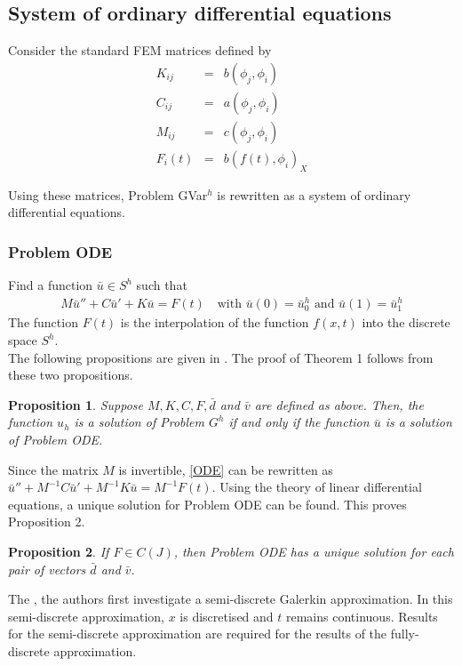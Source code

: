 \documentclass[../../main.tex]{subfiles}
\begin{document}
\subsection{System of ordinary differential equations}
Consider the standard FEM matrices defined by
\begin{eqnarray*}
	K_{ij} & = & b(\phi_j, \phi_i)\\
	C_{ij} & = & a(\phi_j, \phi_i)\\
	M_{ij} & = & c(\phi_j, \phi_i)\\
	F_{i}(t) & = & b(f(t), \phi_i)_X
\end{eqnarray*}

Using these matrices, Problem GVar$^h$ is rewritten as a system of ordinary differential equations.
\subsubsection*{Problem ODE}
Find a function $\bar{u} \in S^h$ such that
\begin{eqnarray}
	M\bar{u}'' + C \bar{u}' + K\bar{u} = F(t) \ \ \ \textrm{ with } \bar{u}(0) = \bar{u}^h_0 \textrm{ and }  \bar{u}(1) = \bar{u}^h_1 \label{ODE}
\end{eqnarray}
The function $F(t)$ is the interpolation of the function $f(x,t)$ into the discrete space $S^h$. \\

The following propositions are given in \cite{BV13}. The proof of Theorem 1 follows from these two propositions.

\newtheorem{DC_Prop2}{Proposition}
\begin{DC_Prop2}
	Suppose $M, K, C, F,\bar{d}$  and $\bar{v}$ are defined as above. Then, the function $u_{h}$ is a solution of Problem $G^{h}$ if and only if the function $\bar{u}$ is a solution of Problem ODE.
\end{DC_Prop2}

Since the matrix $M$ is invertible, \eqref{ODE} can be rewritten as $\bar{u}'' + M^{-1}C\bar{u}' + M^{-1}K \bar{u} = M^{-1}F(t)$. Using the theory of linear differential equations, a unique solution for Problem ODE can be found. This proves Proposition 2.

\newtheorem{DC_Prop3}[DC_Prop2]{Proposition}
\begin{DC_Prop3}
	If $F\in C(J)$, then Problem ODE has a unique solution for each pair of vectors $\bar{d}$ and $\bar{v}.$
\end{DC_Prop3}

The \cite{BV13}, the authors first investigate a semi-discrete Galerkin approximation. In this semi-discrete approximation, $x$ is discretised and $t$ remains continuous. Results for the semi-discrete approximation are required for the results of the fully-discrete approximation.\\
\end{document}

